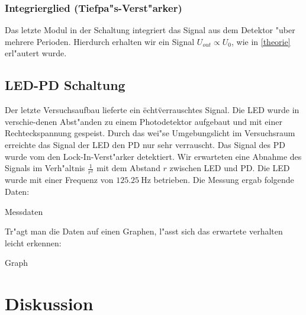 \documentclass{scrartcl}
\begin{document}
			\subsubsection{Integrierglied (Tiefpa"s-Verst"arker)}

				Das letzte Modul in der Schaltung integriert das Signal aus dem Detektor "uber mehrere Perioden.
				Hierdurch erhalten wir ein Signal $U_{out} \propto U_0$, wie in \ref{theorie} erl"autert wurde.

		\subsection{LED-PD Schaltung}

			Der letzte Versuchsaufbau lieferte ein \"echt\" verrauschtes Signal.
			Die LED wurde in verschie-denen Abst"anden zu einem Photodetektor aufgebaut und mit einer Rechteckspannung gespeist.
			Durch das wei"se Umgebungslicht im Versuchsraum erreichte das Signal der LED den PD nur sehr verrauscht.
			Das Signal des PD wurde vom den Lock-In-Verst"arker detektiert.
			Wir erwarteten eine Abnahme des Signals im Verh"altnis $\frac{1}{r^2}$ mit dem Abstand $r$ zwischen LED und PD.
			Die LED wurde mit einer Frequenz von $\SI{125,25}{\hertz}$ betrieben. Die Messung ergab folgende Daten:


			Messdaten


			Tr"agt man die Daten auf einen Graphen, l"asst sich das erwartete verhalten leicht erkennen:


			Graph


	\section{Diskussion}
\end{document}
